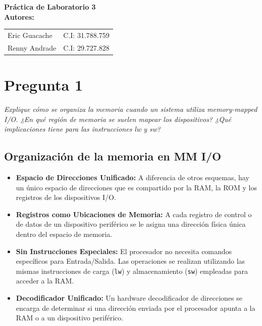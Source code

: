 \documentclass[12pt,a4paper]{article}
\begin{document}
	
	\begin{titlepage}
		\centering
		\vspace*{6cm}
		{\Huge \bfseries Práctica de Laboratorio 3} \\[3cm]
		{\Large \bfseries Autores:} \\[0.5cm]
		\begin{tabular}{ll}
			Eric Guacache & C.I: 31.788.759 \\
			Renny Andrade & C.I: 29.727.828 \\
		\end{tabular}
		\vfill
	\end{titlepage}
	
	\newpage
	\tableofcontents
	\newpage
	
	
	\section{Pregunta 1}
	\textit{Explique cómo se organiza la memoria cuando un sistema utiliza memory-mapped I/O. ¿En qué región de memoria se suelen mapear los dispositivos? ¿Qué implicaciones tiene para las instrucciones lw y sw?}
	
	\subsection{Organización de la memoria en MM I/O}
	\begin{itemize}
		\item \textbf{Espacio de Direcciones Unificado:} A diferencia de otros esquemas, hay un único espacio de direcciones que es compartido por la RAM, la ROM y los registros de los dispositivos I/O.
		\item \textbf{Registros como Ubicaciones de Memoria:} A cada registro de control o de datos de un dispositivo periférico se le asigna una dirección física única dentro del espacio de memoria.
		\item \textbf{Sin Instrucciones Especiales:} El procesador no necesita comandos específicos para Entrada/Salida. Las operaciones se realizan utilizando las mismas instrucciones de carga (\texttt{lw}) y almacenamiento (\texttt{sw}) empleadas para acceder a la RAM.
		\item \textbf{Decodificador Unificado:} Un hardware decodificador de direcciones se encarga de determinar si una dirección enviada por el procesador apunta a la RAM o a un dispositivo periférico.
	\end{itemize}
	
\end{document}

